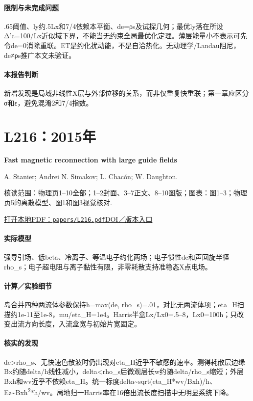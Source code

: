 \paragraph{限制与未完成问题}.65阈值、ly约.5Lx和7/4依赖本平衡、de=ρs及试探几何；最优ly落在所设Δ'c=100/Lx近似域下界，不能当无约束全局最优化定理。薄层能量小不表示可先令de=0消除重联。ET是约化扰动能，不是自洽热化。无动理学/Landau阻尼，de≠ρs推广本文未验证。

\paragraph{本报告判断}新增发现是局域非线性X层与外部位移的关系，而非仅重复快重联；第一章应区分σ和ε，避免混淆2和7/4指数。

\section{L216：2015年}\label{paper:L216}

\textbf{Fast magnetic reconnection with large guide fields}\citep{L216}\

A. Stanier;  Andrei N. Simakov;  L. Chacón;  W. Daughton.

\textsf{核读范围：}物理页1–10全部；1–2封面、3–7正文、8–10图版；\textsf{图表：}图1–3；物理页5的离散模型、图1和图3视觉核对.

\href{run:papers/L216.pdf}{打开本地PDF：\texttt{papers/L216.pdf}}\quad\href{https://doi.org/10.1063/1.4905629}{DOI／版本入口}

\paragraph{实际模型}强导引场、低beta、冷离子、等温电子约化两场；电子惯性de和声回旋半径rho\_s；电子超电阻与离子黏性有限，非零耗散支持准稳态X点电场。

\paragraph{计算／实验细节}岛合并四种两流体参数保持h=max(de, rho\_s)=.01，对比无两流体项；eta\_H扫描约1e-11至1e-8，mu/eta\_H=1e4。Harris半盒Lx/Lx0=.5–8，Lx0=100h；只改变出流方向长度，入流盒宽与初始片宽固定。

\paragraph{核实的发现}de>rho\_s、无快速色散波时仍出现对eta\_H近乎不敏感的速率。测得耗散层边缘Bx约随delta/h线性减小，delta<rho\_s后微观层长w约随delta/rho\_s缩短；外层Bxh和wv近乎不依赖eta\_H。统一标度delta\textasciitilde{}sqrt(eta\_H*wv/Bxh)/h、Ez\textasciitilde{}Bxh\textsuperscript{2}*h/wv。局地归一Harris率在16倍出流长度扫描中无明显系统下降。

